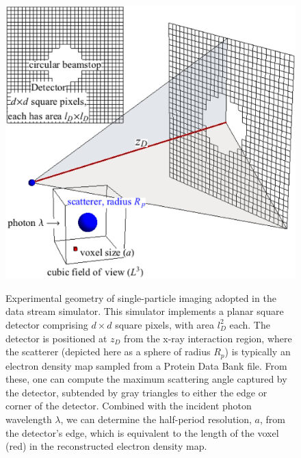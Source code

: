\documentclass[]{iucr}              %
\begin{document}
\begin{figure}
\caption{Experimental geometry of single-particle imaging adopted in the data stream simulator. This simulator implements a planar square detector comprising $d\times d$ square pixels, with area $l_D^2$ each. The detector is positioned at $z_D$ from the x-ray interaction region, where the scatterer (depicted here as a sphere of radius $R_p$) is typically an electron density map sampled from a Protein Data Bank file. From these, one can compute the maximum scattering angle captured by the detector, subtended by gray triangles to either the edge or corner of the detector. Combined with the incident photon wavelength $\lambda$,  we can determine the half-period resolution, $a$, from the detector's edge, which is equivalent to the length of the voxel (red) in the reconstructed electron density map.}
\includegraphics[width=\textwidth]{figures/geometry.eps} \label{fig:expGeometry}
\end{figure}
\end{document}
